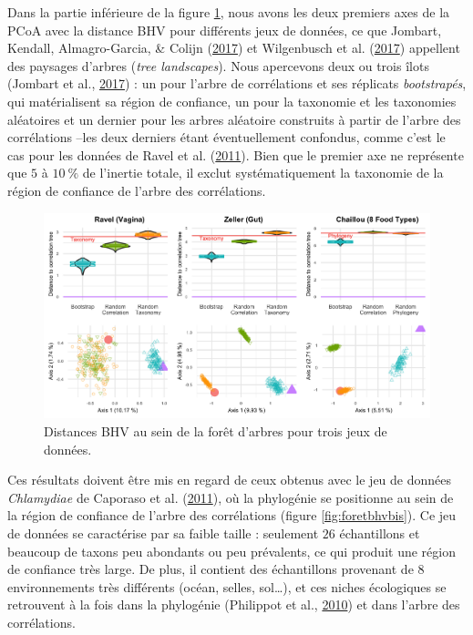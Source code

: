 \documentclass[12pt,a4paper]{reedthesis}
\theoremstyle{definition}
\theoremstyle{definition}
\theoremstyle{definition}
\theoremstyle{remark}
\begin{document}
Dans la partie inférieure de la figure \ref{fig:foretbhv}, nous avons les deux premiers axes de la PCoA avec la distance BHV pour différents jeux de données, ce que Jombart, Kendall, Almagro-Garcia, \& Colijn (\protect\hyperlink{ref-jombart2017treespace}{2017}) et Wilgenbusch et al. (\protect\hyperlink{ref-wilgenbusch2017visualizing}{2017}) appellent des paysages d'arbres (\emph{tree landscapes}). Nous apercevons deux ou trois îlots (Jombart et al., \protect\hyperlink{ref-jombart2017treespace}{2017}) : un pour l'arbre de corrélations et ses réplicats \emph{bootstrapés}, qui matérialisent sa région de confiance, un pour la taxonomie et les taxonomies aléatoires et un dernier pour les arbres aléatoire construits à partir de l'arbre des corrélations --les deux derniers étant éventuellement confondus, comme c'est le cas pour les données de Ravel et al. (\protect\hyperlink{ref-ravel2011vaginal}{2011}). Bien que le premier axe ne représente que \(5\) à \(10~\%\) de l'inertie totale, il exclut systématiquement la taxonomie de la région de confiance de l'arbre des corrélations.


\begin{figure}[t]

{\centering \includegraphics[width=0.9\linewidth]{img/foretbhv} 

}

\caption{Distances BHV au sein de la forêt d'arbres pour trois jeux de données.}\label{fig:foretbhv}
\end{figure}
Ces résultats doivent être mis en regard de ceux obtenus avec le jeu de données \emph{Chlamydiae} de Caporaso et al. (\protect\hyperlink{ref-caporaso2011global}{2011}), où la phylogénie se positionne au sein de la région de confiance de l'arbre des corrélations (figure \ref{fig:foretbhvbis}). Ce jeu de données se caractérise par sa faible taille : seulement \(26\) échantillons et beaucoup de taxons peu abondants ou peu prévalents, ce qui produit une région de confiance très large. De plus, il contient des échantillons provenant de \(8\) environnements très différents (océan, selles, sol\ldots), et ces niches écologiques se retrouvent à la fois dans la phylogénie (Philippot et al., \protect\hyperlink{ref-philippot2010ecological}{2010}) et dans l'arbre des corrélations.
\end{document}
